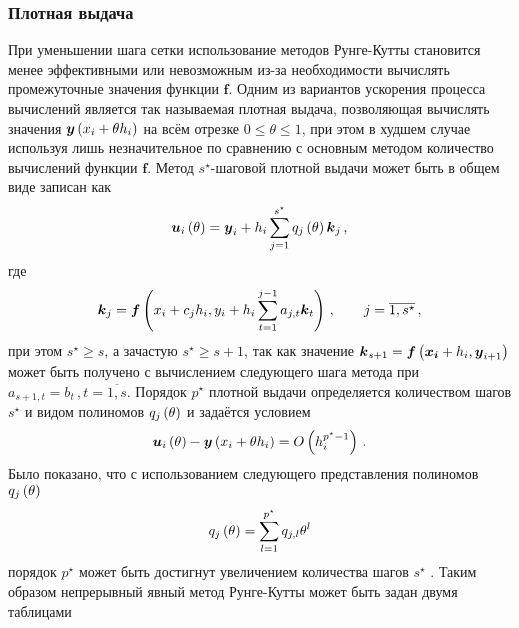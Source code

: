 \documentclass[../document.tex]{subfiles}
\begin{document}
			\subsubsection{Плотная выдача}
				\par При уменьшении шага сетки использование методов Рунге-Кутты становится менее эффективными или невозможным из-за необходимости вычислять промежуточные значения функции $\boldsymbol{f}$. Одним из вариантов ускорения процесса вычислений является так называемая плотная выдача, позволяющая вычислять значения $\boldsymbol{y}\left(x_i+\theta h_i\right)$ на всём отрезке $0\leqslant\theta\leqslant1$, при этом в худшем случае используя лишь незначительное по сравнению с основным методом количество вычислений функции $\boldsymbol{f}$. Метод $s^{\star}$-шаговой плотной выдачи может быть в общем виде записан как 
				\begin{equation}
					\boldsymbol{u}_i\left(\theta\right)=\boldsymbol{y}_i+h_i\sum\limits_{j=1}^{s^{\star}}q_j\left(\theta\right)\boldsymbol{k}_j\,,
				\end{equation}
				где 
				\begin{equation}
					\boldsymbol{k}_j=\boldsymbol{f}\left(x_i+c_jh_i,y_i+h_i\sum\limits_{t=1}^{j-1}a_{j,t}\boldsymbol{k}_t\right)\,,\qquad j=\overline{1,s^{\star}}\,,
				\end{equation}
				при этом $s^{\star}\geqslant s$, а зачастую $s^{\star}\geqslant s+1$, так как значение $\boldsymbol{k}_{s+1}=\boldsymbol{f}\left(\boldsymbol{x_i}+h_i,\boldsymbol{y}_{i+1}\right)$ может быть получено с вычислением следующего шага метода при $a_{s+1,t}=b_{t}\,,t=\overline{1,s}$. Порядок $p^{\star}$ плотной выдачи определяется количеством шагов $s^{\star}$ и видом полиномов $q_j\left(\theta\right)$ и задаётся условием
				\begin{equation}
					\boldsymbol{u}_i\left(\theta\right)-\boldsymbol{y}\left(x_i+\theta h_i\right)=O\left(h_i^{p^{\star}-1}\right)\,.
				\end{equation}
				Было показано, что с использованием следующего представления полиномов $q_j\left(\theta\right)$
				\begin{equation}
					q_j\left(\theta\right)=\sum\limits_{l=1}^{p^{\star}}q_{j,l}\theta^l
				\end{equation}
				порядок $p^{\star}$ может быть достигнут увеличением количества шагов $s^{\star}$ \cite{dense}. Таким образом непрерывный явный метод Рунге-Кутты может быть задан двумя таблицами
\end{document}
